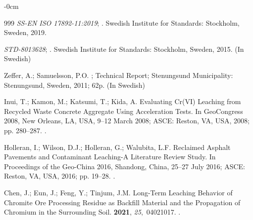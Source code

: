 \documentclass[algorithms,article,accept,pdftex,moreauthors]{Definitions/mdpi}
\begin{document}
\begin{adjustwidth}{-\extralength}{0cm}
\begin{thebibliography}{999}
\emph{SS-EN ISO 17892-11:2019};
.
\newblock Swedish Institute for Standards: Stockholm, Sweden, 2019. %

 \emph{STD-8013628};
.
\newblock Swedish Institute for Standards: Stockholm, Sweden, 2015. (In Swedish) %

Zeffer, A.; Samuelsson, P.O.
;
\newblock Technical Report; Stenungsund Municipality: Stenungsund, Sweden,
  2011;
\newblock  62p. (In Swedish)

Inui, T.; Kamon, M.; Katsumi, T.; Kida, A. Evaluating Cr(VI) Leaching from
  Recycled Waste Concrete Aggregate Using Acceleration Tests.
\newblock In GeoCongress 2008, New Orleans, LA, USA, 9--12 March 2008; ASCE: Reston, VA, USA, 2008; pp. 280--287. %
.

Holleran, I.; Wilson, D.J.; Holleran, G.; Walubita, L.F. Reclaimed Asphalt
  Pavements and Contaminant Leaching-A Literature Review Study.
\newblock In Proceedings of the  Geo-China 2016, Shandong, China, 25--27 July 2016; ASCE: Reston, VA, USA, 2016; pp. 19--28. %
.

Chen, J.; Eun, J.; Feng, Y.; Tinjum, J.M.
\newblock Long-Term Leaching Behavior of Chromite Ore Processing Residue as
  Backfill Material and the Propagation of Chromium in the Surrounding Soil.
 {\bf 2021},
  {\em 25},~04021017.
.


\end{thebibliography}
\end{adjustwidth}
\end{document}
